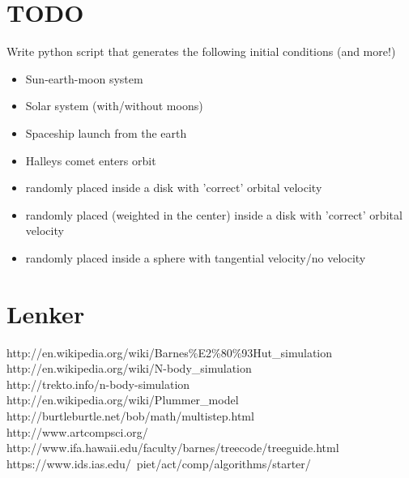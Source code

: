 \documentclass[11pt, oneside]{article}   	%
\begin{document}
\section{TODO}


Write python script that generates the following initial conditions (and more!)
\begin{itemize}

\item Sun-earth-moon system
\item Solar system (with/without moons)
\item Spaceship launch from the earth
\item Halleys comet enters orbit

\item randomly placed inside a disk with 'correct' orbital velocity
\item randomly placed (weighted in the center) inside a disk with 'correct' orbital velocity
\item randomly placed inside a sphere with tangential velocity/no velocity

\end{itemize}

\newpage
\section{Lenker}
http://en.wikipedia.org/wiki/Barnes\%E2\%80\%93Hut\_simulation\\
http://en.wikipedia.org/wiki/N-body\_simulation\\
http://trekto.info/n-body-simulation\\
http://en.wikipedia.org/wiki/Plummer\_model\\
http://burtleburtle.net/bob/math/multistep.html\\
http://www.artcompsci.org/
http://www.ifa.hawaii.edu/faculty/barnes/treecode/treeguide.html\\
https://www.ids.ias.edu/~piet/act/comp/algorithms/starter/
\end{document}
